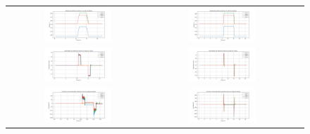 \begin{figure}[H]
\centering
\begin{tabular}{ccc}
  \includegraphics[width=0.5\textwidth]{figs/appendix/teste_velocidades/finger_positions_vel50.png} &
  \includegraphics[width=0.5\textwidth]{figs/appendix/teste_velocidades/finger_positions_vel1000.png} \\
  \includegraphics[width=0.5\textwidth]{figs/appendix/teste_velocidades/finger_velocities_vel50.png} &
  \includegraphics[width=0.5\textwidth]{figs/appendix/teste_velocidades/finger_velocities_vel1000.png} \\
  \includegraphics[width=0.5\textwidth]{figs/appendix/teste_velocidades/finger_currents_vel50.png} &
  \includegraphics[width=0.5\textwidth]{figs/appendix/teste_velocidades/finger_currents_vel1000.png} \\

\end{tabular}
\end{figure}
